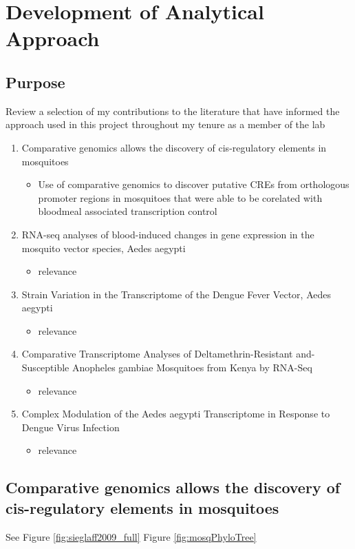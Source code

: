 \chapter{Development of Analytical Approach}

\section{Purpose}
Review a selection of my contributions to the literature that have informed the approach used in this project throughout my tenure as a member of the lab
\begin{enumerate}
 \item Comparative genomics allows the discovery of cis-regulatory elements in mosquitoes
  \begin{itemize}
   \item Use of comparative genomics to discover putative CREs from orthologous promoter regions in mosquitoes that were able to be corelated with bloodmeal associated transcription control
  \end{itemize}
 \item RNA-seq analyses of blood-induced changes in gene expression in the mosquito vector species, Aedes aegypti
  \begin{itemize}
   \item relevance
  \end{itemize}

 \item Strain Variation in the Transcriptome of the Dengue Fever Vector, Aedes aegypti
   \begin{itemize}
   \item relevance
  \end{itemize}
 \item Comparative Transcriptome Analyses of Deltamethrin-Resistant and-Susceptible Anopheles gambiae Mosquitoes from Kenya by RNA-Seq
   \begin{itemize}
   \item relevance
  \end{itemize}
 \item Complex Modulation of the Aedes aegypti Transcriptome in Response to Dengue Virus Infection
   \begin{itemize}
   \item relevance
  \end{itemize}
\end{enumerate}

\section{Comparative genomics allows the discovery of cis-regulatory elements in mosquitoes}

See Figure \ref{fig:sieglaff2009_full}
Figure \ref{fig:mosqPhyloTree}




